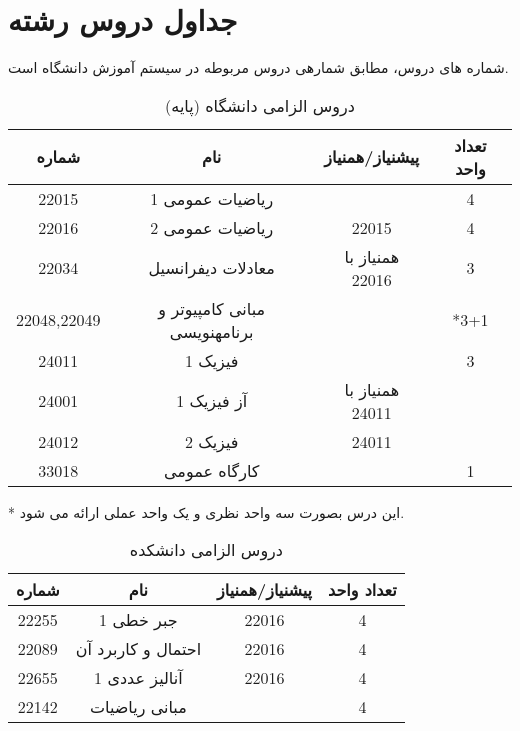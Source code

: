 \documentclass{article}
\begin{document}
	\section{
	جداول دروس رشته
}
شماره های دروس، مطابق شمارهی دروس مربوطه در سیستم آموزش دانشگاه است.
\begin{table}[H]
\begin{center}
	\begin{tabular}{|c|c|c|c|}
		\hline
		شماره & نام & پیشنیاز/همنیاز & تعداد واحد  \\
		\hline
		22015 & ریاضیات عمومی 1 &  & 4 \\
		\hline
		22016 & ریاضیات عمومی 2 & 22015 & 4 \\
		\hline
		22034 & معادلات دیفرانسیل & همنیاز با 22016 & 3 \\
		\hline
		22048,22049 & مبانی کامپیوتر و برنامهنویسی &  & *3+1 \\
		\hline
		24011 & فیزیک 1 &  & 3 \\
		\hline
		24001 & آز فیزیک 1 & همنیاز با 24011 &  \\
		\hline
		24012 & فیزیک 2 & 24011 &  \\
		\hline
		33018 & کارگاه عمومی &  & 1 \\
		\hline
	\end{tabular}
\caption{\label{cs-t2}
دروس الزامی دانشگاه (پایه)
}
\end{center}
\end{table}
* این درس بصورت سه واحد نظری و یک واحد عملی ارائه می شود.
\begin{table}[H]
\begin{center}
\begin{tabular}{|c|c|c|c|}
	\hline
	شماره & نام & پیشنیاز/همنیاز & تعداد واحد \\
	\hline
	22255 & جبر خطی 1 & 22016 & 4 \\
	\hline
	22089 & احتمال و کاربرد آن & 22016 & 4 \\
	\hline
	22655 & آنالیز عددی 1 & 22016 & 4 \\
	\hline
	22142 & مبانی ریاضیات &  & 4 \\
	\hline
\end{tabular}
\caption{\label{cs-t3}
دروس الزامی دانشکده
}
\end{center}
\end{table}
\end{document}
